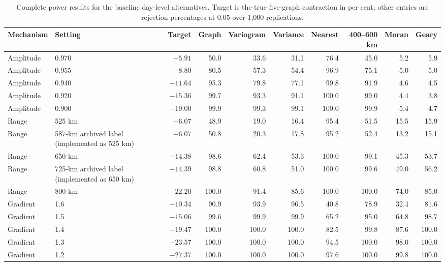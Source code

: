 \documentclass[namedate,webpdf,modern,mediumone]{oup-authoring-template}
\theoremstyle{thmstyleone}
\begin{document}
\begin{table}[htbp]
\centering
\caption{Complete power results for the baseline day-level alternatives.
Target is the true five-graph contraction in per cent; other entries are
rejection percentages at 0.05 over 1,000 replications.}
\label{tab:baseline-power-complete}
\scriptsize
\setlength{\tabcolsep}{2.2pt}
\begin{tabularx}{\textwidth}{lXrrrrrrrr}
\toprule
Mechanism & Setting & Target & Graph & Variogram & Variance & Nearest & 400--600 km & Moran & Geary \\
\midrule
Amplitude & 0.970 & $-5.91$  & 50.0 & 33.6 & 31.1 & 76.4 & 45.0 & 5.2 & 5.9 \\
Amplitude & 0.955 & $-8.80$  & 80.5 & 57.3 & 54.4 & 96.9 & 75.1 & 5.0 & 5.0 \\
Amplitude & 0.940 & $-11.64$ & 95.3 & 79.8 & 77.1 & 99.8 & 91.9 & 4.6 & 4.5 \\
Amplitude & 0.920 & $-15.36$ & 99.7 & 93.3 & 91.1 & 100.0 & 99.0 & 4.4 & 3.8 \\
Amplitude & 0.900 & $-19.00$ & 99.9 & 99.3 & 99.1 & 100.0 & 99.9 & 5.4 & 4.7 \\
\midrule
Range & 525 km & $-6.07$  & 48.9 & 19.0 & 16.4 & 95.4 & 51.5 & 15.5 & 15.9 \\
Range & 587-km archived label (implemented as 525 km) & $-6.07$  & 50.8 & 20.3 & 17.8 & 95.2 & 52.4 & 13.2 & 15.1 \\
Range & 650 km & $-14.38$ & 98.6 & 62.4 & 53.3 & 100.0 & 99.1 & 45.3 & 53.7 \\
Range & 725-km archived label (implemented as 650 km) & $-14.39$ & 98.8 & 60.8 & 51.0 & 100.0 & 99.6 & 49.0 & 56.2 \\
Range & 800 km & $-22.20$ & 100.0 & 91.4 & 85.6 & 100.0 & 100.0 & 74.0 & 85.0 \\
\midrule
Gradient & 1.6 & $-10.34$ & 90.9 & 93.9 & 96.5 & 40.8 & 78.9 & 32.4 & 81.6 \\
Gradient & 1.5 & $-15.06$ & 99.6 & 99.9 & 99.9 & 65.2 & 95.0 & 64.8 & 98.7 \\
Gradient & 1.4 & $-19.47$ & 100.0 & 100.0 & 100.0 & 82.5 & 99.8 & 87.6 & 100.0 \\
Gradient & 1.3 & $-23.57$ & 100.0 & 100.0 & 100.0 & 94.5 & 100.0 & 98.0 & 100.0 \\
Gradient & 1.2 & $-27.37$ & 100.0 & 100.0 & 100.0 & 97.6 & 100.0 & 99.8 & 100.0 \\
\bottomrule
\end{tabularx}
\end{table}
\end{document}
